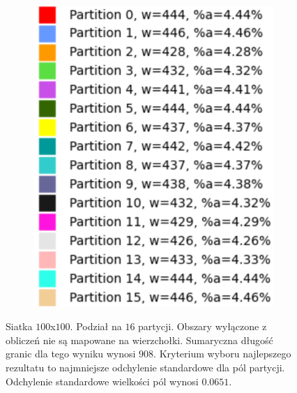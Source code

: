 \begin{figure}[h]
\begin{subfigure}{.33\textwidth}
    \caption[short]{}
\end{subfigure}%
\begin{subfigure}{.33\textwidth}
    \centering
    \includegraphics[width=0.9\linewidth]{images/results/m_k/with/17/results}
    \caption[short]{}
\end{subfigure}
\caption{Siatka $100$x$100$. Podział na $16$ partycji.
Obszary wyłączone z obliczeń nie są mapowane na wierzchołki.
Sumaryczna długość granic dla tego wyniku wynosi $908$.
Kryterium wyboru najlepszego rezultatu to najmniejsze odchylenie standardowe dla pól partycji.
Odchylenie standardowe wielkości pól wynosi $0.0651$.}
\label{result:17}
\end{figure}
